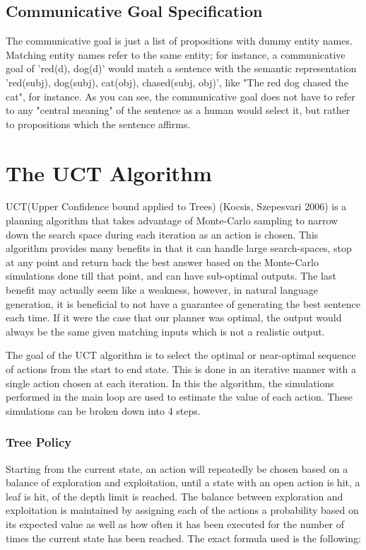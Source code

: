 \subsection{Communicative Goal Specification}

The communicative goal is just a list of propositions with dummy entity names.  Matching entity
names refer to the same entity; for instance, a communicative goal of 'red(d), dog(d)' would
match a sentence with the semantic representation 'red(subj), dog(subj), cat(obj), chased(subj, obj)',
like "The red dog chased the cat", for instance.  As you can see, the communicative goal does
not have to refer to any "central meaning" of the sentence as a human would select it, but rather
to propositions which the sentence affirms.

\section{The UCT Algorithm}

UCT(Upper Confidence bound applied to Trees) (Kocsis, Szepesvari 2006) is a planning algorithm that takes advantage of Monte-Carlo sampling to narrow down the search space during each iteration as an action is chosen.  This algorithm provides many benefits in that it can handle large search-spaces, stop at any point and return back the best answer based on the Monte-Carlo simulations done till that point, and can have sub-optimal outputs.  The last benefit may actually seem like a weakness, however, in natural language generation, it is beneficial to not have a guarantee of generating the best sentence each time.  If it were the case that our planner was optimal, the output would always be the same given matching inputs which is not a realistic output.

The goal of the UCT algorithm is to select the optimal or near-optimal sequence of actions from the start to end state.  This is done in an iterative manner with a single action chosen at each iteration.  In this the algorithm, the simulations performed in the main loop are used to estimate the value of each action.  These simulations can be broken down into 4 steps.

\subsubsection{Tree Policy}
Starting from the current state, an action will repeatedly be chosen based on a balance of exploration and exploitation, until a state with an open action is hit, a leaf is hit, of the depth limit is reached.  The balance between exploration and exploitation is maintained by assigning each of the actions a probability based on its expected value as well as how often it has been executed for the number of times the current state has been reached.  The exact formula used is the following:

